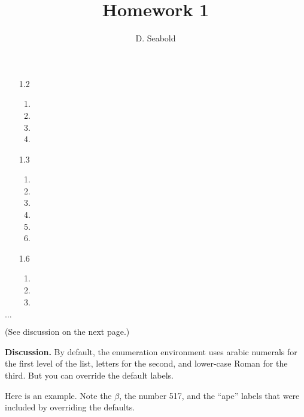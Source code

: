 \documentclass[12pt]{article}
\begin{document}
\title{Homework 1}
\author{D. Seabold}

\maketitle


\begin{enumerate}
\item[1.2]
\begin{enumerate}
\item
\item
\item
\item
\end{enumerate}


\item[1.3]
\begin{enumerate}
\item
\item
\item
\item
\item
\item
\end{enumerate}

\item[1.6]
\begin{enumerate}
\item
\item
\item
\end{enumerate}

\end{enumerate}

$\ldots$

(See discussion on the next page.)

\newpage

{\bf Discussion.}
By default, the enumeration environment uses arabic numerals for the first level of the list, letters for the second, and lower-case Roman for the third. But you can override the default labels.

Here is an example. Note the $\beta$, the number 517, and the ``ape'' labels that were included by overriding the defaults.
\end{document}
